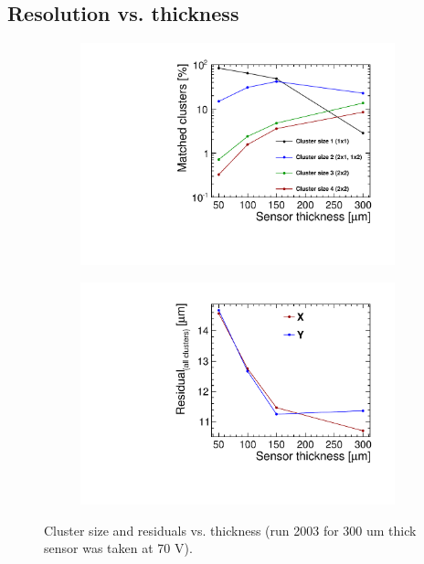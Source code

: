 \subsection{Resolution vs. thickness}
\begin{figure}[htbp] \centering
  \begin{subfigure}[b]{0.45\textwidth}
    \includegraphics[width=\textwidth]{./figures/TestBeam/cluSize_vs_thickness.pdf}
    \caption{}
  \end{subfigure} \hfill
  \begin{subfigure}[b]{0.45\textwidth}
    \includegraphics[width=\textwidth]{./figures/TestBeam/residuals_vs_thickness.pdf}
    \caption{}
  \end{subfigure}
  \caption{Cluster size and residuals vs. thickness (run 2003 for 300 um thick sensor was taken at 70 V).}
  \label{fig:clusize_residuals_vs_thickness}
\end{figure}



